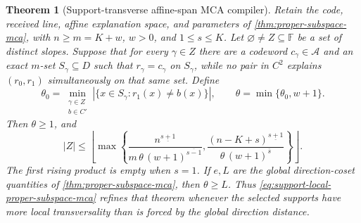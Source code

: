 \documentclass[11pt,a4paper]{amsart}
\numberwithin{equation}{section}
\newtheorem{theorem}{Theorem}[section]
\theoremstyle{remark}
\newcommand{\F}{\mathbb F}\newcommand{\B}{\mathbb B}\newcommand{\K}{\mathbb K}\newcommand{\Z}{\mathbb Z}
\begin{document}
\begin{theorem}[Support-transverse affine-span MCA compiler]
\label{thm:support-transverse-affine-span-mca}
Retain the code, received line, affine explanation space, and parameters of
\cref{thm:proper-subspace-mca}, with \(n\ge m=K+w\), \(w>0\), and
\(1\le s\le K\).  Let \(\varnothing\ne Z\subseteq\F\) be a set of
distinct slopes.  Suppose that for every \(\gamma\in Z\) there are a
codeword \(c_\gamma\in\mathcal A\) and an exact \(m\)-set
\(S_\gamma\subseteq D\) such that \(r_\gamma=c_\gamma\) on
\(S_\gamma\), while no pair in \(C^2\) explains \((r_0,r_1)\)
simultaneously on that same set.  Define
\begin{equation}
 \theta_0=
 \min_{\substack{\gamma\in Z\\ b\in C'}}
 |\{x\in S_\gamma:r_1(x)\ne b(x)\}|,
 \qquad
 \theta=\min\{\theta_0,w+1\}.
 \label{eq:support-local-mca-theta}
\end{equation}
Then \(\theta\ge1\), and
\begin{equation}
 |Z|\le
 \left\lfloor
 \max\left\{
 \frac{n^{\underline{s+1}}}
      {m\,\theta\,(w+1)^{\overline{s-1}}},
 \frac{(n-K+s)^{\underline{s+1}}}
      {\theta\,(w+1)^{\overline s}}
 \right\}
 \right\rfloor .
 \label{eq:support-local-proper-subspace-mca}
\end{equation}
The first rising product is empty when \(s=1\).  If \(e,L\) are the
global direction-coset quantities of \cref{thm:proper-subspace-mca}, then
\(\theta\ge L\).  Thus \eqref{eq:support-local-proper-subspace-mca}
refines that theorem whenever the selected supports have more local
transversality than is forced by the global direction distance.
\end{theorem}
\end{document}
